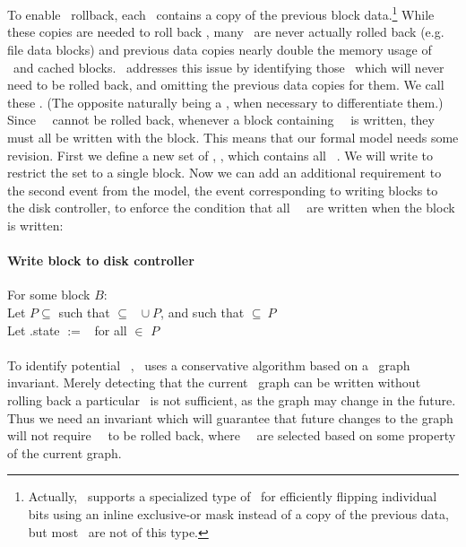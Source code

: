 \subsection{\Nrb\ \ChDescs}
\label{sec:chdescs:nrb}
To enable \chdesc\ rollback, each \chdesc\ contains a copy of the previous block
data.\footnote{Actually, \Kudos\ supports a specialized type of \chdesc\ for
efficiently flipping individual bits using an inline exclusive-or mask instead
of a copy of the previous data, but most \chdescs\ are not of this type.}
%
While these copies are needed to roll back \chdescs, many \chdescs\ are never
actually rolled back (e.g. file data blocks) and previous data copies nearly
double the memory usage of \chdescs\ and cached blocks.
%
\Kudos\ addresses this issue by identifying those \chdescs\ which will never
need to be rolled back, and omitting the previous data copies for them. We call
these \emph{\nrb} \chdescs. (The opposite naturally being a \emph{\rb} \chdesc,
when necessary to differentiate them.) Since \nrb\ \chdescs\ cannot be rolled
back, whenever a block containing \nrb\ \chdescs\ is written, they must all be
written with the block. This means that our formal model needs some revision.
First we define a new set of \chdescs, \ChNrb, which contains all \nrb\
\chdescs. We will write  to restrict the set to a single block. Now we
can add an additional requirement to the second event from the model, the event
corresponding to writing blocks to the disk controller, to enforce the condition
that all \nrb\ \chdescs\ are written when the block is written:

\paragraph{Write block to disk controller}
For some block $B$: \\
Let $P \subseteq$  such that  $\subseteq$ \ChDisk\ $\cup\ P$,
and such that \ChNrbB{B} $\subseteq\ P$ \\
Let .state $:=$ \stateinf\ for all  $\in$ $P$

\paragraph{} To identify potential \nrb\ \chdescs, \Kudos\ uses a conservative
algorithm based on a \chdesc\ graph invariant. Merely detecting that the current
\chdesc\ graph can be written without rolling back a particular \chdesc\ is not
sufficient, as the graph may change in the future. Thus we need an invariant
which will guarantee that future changes to the graph will not require \nrb\
\chdescs\ to be rolled back, where \nrb\ \chdescs\ are selected based on some
property of the current graph.

